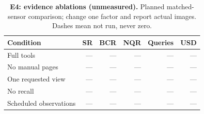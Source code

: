 \begin{table}[!ht]
\centering\small
\caption{\textbf{E4: evidence ablations (unmeasured).} Planned matched-sensor comparison; change one factor and report actual images. Dashes mean not run, never zero.}
\begin{tabularx}{\textwidth}{@{}Xrrrrr@{}}\toprule
Condition & SR & BCR & NQR & Queries & USD\\\midrule
Full tools & --- & --- & --- & --- & ---\\
No manual pages & --- & --- & --- & --- & ---\\
One requested view & --- & --- & --- & --- & ---\\
No recall & --- & --- & --- & --- & ---\\
Scheduled observations & --- & --- & --- & --- & ---\\
\bottomrule
\end{tabularx}
\end{table}
